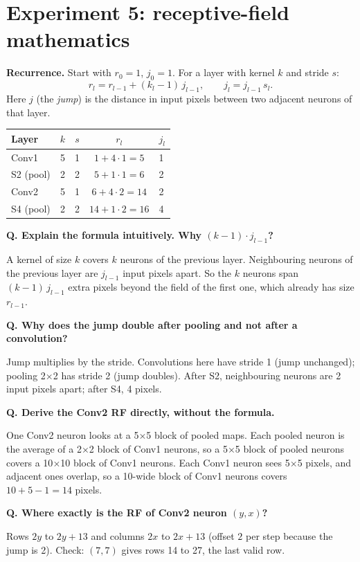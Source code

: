 \documentclass[11pt]{article}
\newcommand{\Q}[1]{\par\vspace{4pt}\noindent\textcolor{qcol}{\textbf{Q. #1}}\par\nopagebreak}
\newcommand{\A}[1]{\noindent #1\par}
\begin{document}
\section{Experiment 5: receptive-field mathematics}

\textbf{Recurrence.} Start with $r_0=1$, $j_0=1$. For a layer with kernel $k$ and stride $s$:
\[
r_l=r_{l-1}+(k_l-1)\,j_{l-1},\qquad j_l=j_{l-1}\,s_l.
\]
Here $j$ (the \emph{jump}) is the distance in input pixels between two adjacent neurons of that layer.

\begin{table}[h]
\centering
\begin{tabular}{lcccl}
\toprule
Layer & $k$ & $s$ & $r_l$ & $j_l$ \\
\midrule
Conv1 & 5 & 1 & $1+4\cdot1=5$ & 1 \\
S2 (pool) & 2 & 2 & $5+1\cdot1=6$ & 2 \\
Conv2 & 5 & 1 & $6+4\cdot2=14$ & 2 \\
S4 (pool) & 2 & 2 & $14+1\cdot2=16$ & 4 \\
\bottomrule
\end{tabular}
\end{table}

\Q{Explain the formula intuitively. Why $(k-1)\cdot j_{l-1}$?}
\A{A kernel of size $k$ covers $k$ neurons of the previous layer. Neighbouring neurons of the previous layer are $j_{l-1}$ input pixels apart. So the $k$ neurons span $(k-1)\,j_{l-1}$ extra pixels beyond the field of the first one, which already has size $r_{l-1}$.}

\Q{Why does the jump double after pooling and not after a convolution?}
\A{Jump multiplies by the stride. Convolutions here have stride 1 (jump unchanged); pooling 2$\times$2 has stride 2 (jump doubles). After S2, neighbouring neurons are 2 input pixels apart; after S4, 4 pixels.}

\Q{Derive the Conv2 RF directly, without the formula.}
\A{One Conv2 neuron looks at a 5$\times$5 block of pooled maps. Each pooled neuron is the average of a 2$\times$2 block of Conv1 neurons, so a 5$\times$5 block of pooled neurons covers a 10$\times$10 block of Conv1 neurons. Each Conv1 neuron sees 5$\times$5 pixels, and adjacent ones overlap, so a 10-wide block of Conv1 neurons covers $10+5-1=14$ pixels.}

\Q{Where exactly is the RF of Conv2 neuron $(y,x)$?}
\A{Rows $2y$ to $2y+13$ and columns $2x$ to $2x+13$ (offset $2$ per step because the jump is 2). Check: $(7,7)$ gives rows 14 to 27, the last valid row.}
\end{document}
